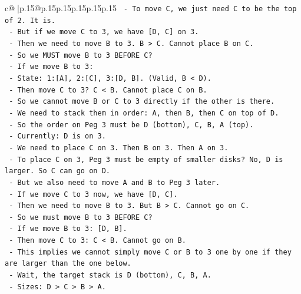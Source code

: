 \documentclass{article}
\begin{document}
{\begin{supertabular}{c@{$\;$}|p{.15\linewidth}@{}p{.15\linewidth}p{.15\linewidth}p{.15\linewidth}p{.15\linewidth}p{.15\linewidth}}
{{{\texttt{               {-} To move C, we just need C to be the top of 2. It is.} \\
\texttt{               {-} But if we move C to 3, we have {[}D, C{]} on 3.} \\
\texttt{               {-} Then we need to move B to 3. B > C. Cannot place B on C.} \\
\texttt{               {-} So we MUST move B to 3 BEFORE C?} \\
\texttt{               {-} If we move B to 3:} \\
\texttt{                 {-} State: 1:{[}A{]}, 2:{[}C{]}, 3:{[}D, B{]}. (Valid, B < D).} \\
\texttt{                 {-} Then move C to 3? C < B. Cannot place C on B.} \\
\texttt{                 {-} So we cannot move B or C to 3 directly if the other is there.} \\
\texttt{                 {-} We need to stack them in order: A, then B, then C on top of D.} \\
\texttt{                 {-} So the order on Peg 3 must be D (bottom), C, B, A (top).} \\
\texttt{                 {-} Currently: D is on 3.} \\
\texttt{                 {-} We need to place C on 3. Then B on 3. Then A on 3.} \\
\texttt{                 {-} To place C on 3, Peg 3 must be empty of smaller disks? No, D is larger. So C can go on D.} \\
\texttt{                 {-} But we also need to move A and B to Peg 3 later.} \\
\texttt{                 {-} If we move C to 3 now, we have {[}D, C{]}.} \\
\texttt{                 {-} Then we need to move B to 3. But B > C. Cannot go on C.} \\
\texttt{                 {-} So we must move B to 3 BEFORE C?} \\
\texttt{                 {-} If we move B to 3: {[}D, B{]}.} \\
\texttt{                 {-} Then move C to 3: C < B. Cannot go on B.} \\
\texttt{                 {-} This implies we cannot simply move C or B to 3 one by one if they are larger than the one below.} \\
\texttt{                 {-} Wait, the target stack is D (bottom), C, B, A.} \\
\texttt{                 {-} Sizes: D > C > B > A.} \\
}}}
\end{supertabular}}
\end{document}
